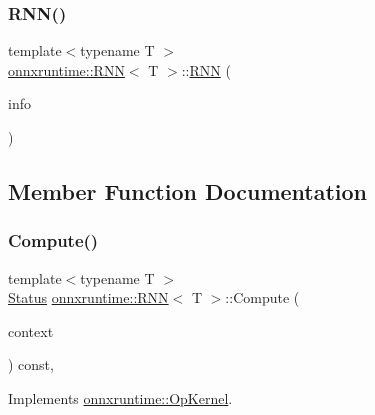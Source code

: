 \subsubsection{\texorpdfstring{R\+N\+N()}{RNN()}}
{\footnotesize\ttfamily template$<$typename T $>$ \\
\mbox{\hyperlink{classonnxruntime_1_1RNN}{onnxruntime\+::\+R\+NN}}$<$ T $>$\+::\mbox{\hyperlink{classonnxruntime_1_1RNN}{R\+NN}} (\begin{DoxyParamCaption}\item[{const \mbox{\hyperlink{classonnxruntime_1_1OpKernelInfo}{Op\+Kernel\+Info}} \&}]{info }\end{DoxyParamCaption})\hspace{0.3cm}{\ttfamily [inline]}}



\subsection{Member Function Documentation}
\mbox{\label{classonnxruntime_1_1RNN_adc74b545debd7e2060a30ca6836d6dbe}} 
\subsubsection{\texorpdfstring{Compute()}{Compute()}\hspace{0.1cm}{\footnotesize\ttfamily [1/2]}}
{\footnotesize\ttfamily template$<$typename T $>$ \\
\mbox{\hyperlink{classonnxruntime_1_1common_1_1Status}{Status}} \mbox{\hyperlink{classonnxruntime_1_1RNN}{onnxruntime\+::\+R\+NN}}$<$ T $>$\+::Compute (\begin{DoxyParamCaption}\item[{\mbox{\hyperlink{classonnxruntime_1_1OpKernelContext}{Op\+Kernel\+Context}} $\ast$}]{context }\end{DoxyParamCaption}) const\hspace{0.3cm}{\ttfamily [override]}, {\ttfamily [virtual]}}



Implements \mbox{\hyperlink{classonnxruntime_1_1OpKernel_a9eca8656a78b1b3ab9d3351a12798650}{onnxruntime\+::\+Op\+Kernel}}.

\mbox{\label{classonnxruntime_1_1RNN_a1690908413185815adb7b182363e55cf}} 
